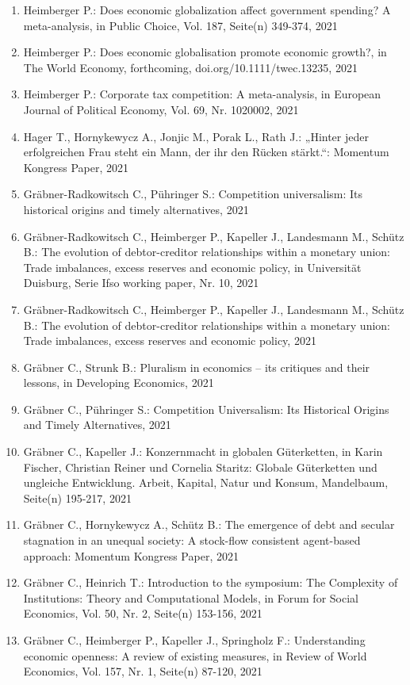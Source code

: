 \begin{enumerate}
	 \item Heimberger P.: Does economic globalization affect government spending? A meta-analysis, in Public Choice, Vol. 187, Seite(n) 349-374, 2021
	 \item Heimberger P.: Does economic globalisation promote economic growth?, in The World Economy, forthcoming, doi.org/10.1111/twec.13235, 2021
	 \item Heimberger P.: Corporate tax competition: A meta-analysis, in European Journal of Political Economy, Vol. 69, Nr. 1020002, 2021
	 \item Hager T., Hornykewycz A., Jonjic M., Porak L., Rath J.: „Hinter jeder erfolgreichen Frau steht ein Mann, der ihr den Rücken stärkt.“: Momentum Kongress Paper, 2021
	 \item Gräbner-Radkowitsch C., Pühringer S.: Competition universalism: Its historical origins and timely alternatives, 2021
	 \item Gräbner-Radkowitsch C., Heimberger P., Kapeller J., Landesmann M., Schütz B.: The evolution of debtor-creditor relationships within a monetary union: Trade imbalances, excess reserves and economic policy, in Universität Duisburg, Serie Ifso working paper, Nr. 10, 2021
	 \item Gräbner-Radkowitsch C., Heimberger P., Kapeller J., Landesmann M., Schütz B.: The evolution of debtor-creditor relationships within a monetary union: Trade imbalances, excess reserves and economic policy, 2021
	 \item Gräbner C., Strunk B.: Pluralism in economics – its critiques and their lessons, in Developing Economics, 2021
	 \item Gräbner C., Pühringer S.: Competition Universalism: Its Historical Origins and Timely Alternatives, 2021
	 \item Gräbner C., Kapeller J.: Konzernmacht in globalen Güterketten, in Karin Fischer, Christian Reiner und Cornelia Staritz: Globale Güterketten und ungleiche Entwicklung. Arbeit, Kapital, Natur und Konsum, Mandelbaum, Seite(n) 195-217, 2021
	 \item Gräbner C., Hornykewycz A., Schütz B.: The emergence of debt and secular stagnation in an unequal society: A stock-flow consistent agent-based approach: Momentum Kongress Paper, 2021
	 \item Gräbner C., Heinrich T.: Introduction to the symposium: The Complexity of Institutions: Theory and Computational Models, in Forum for Social Economics, Vol. 50, Nr. 2, Seite(n) 153-156, 2021
	 \item Gräbner C., Heimberger P., Kapeller J., Springholz F.: Understanding economic openness: A review of existing measures, in Review of World Economics, Vol. 157, Nr. 1, Seite(n) 87-120, 2021

\end{enumerate}
